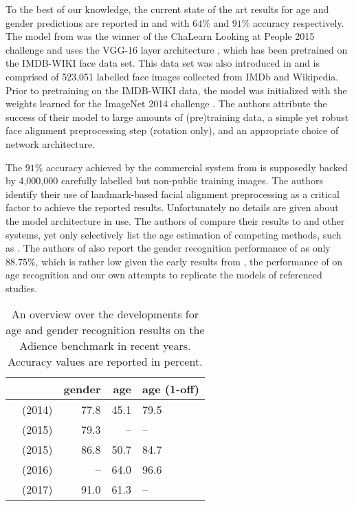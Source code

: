 \documentclass[10pt,twocolumn,letterpaper]{article}
\begin{document}
To the best of our knowledge, the current state of the art results for age and gender predictions are reported in \cite{rothe2016deep} and \cite{dehghan2017dager} with $64\%$ and $91\%$ accuracy respectively. The model from \cite{rothe2016deep} was the winner of the ChaLearn Looking at People 2015 challenge \cite{escalera2015chalearn} and uses the VGG-16 layer architecture \cite{simonyan2014very}, which has been pretrained on the IMDB-WIKI face data set. This data set was also introduced in \cite{rothe2016deep} and is comprised of 523,051 labelled face images collected from IMDb and Wikipedia. Prior to pretraining on the IMDB-WIKI data, the model was initialized with the weights learned for the ImageNet 2014 challenge \cite{russakovsky2015imagenet}. The authors attribute the success of their model to large amounts of (pre)training data, a simple yet robust face alignment preprocessing step (rotation only), and an appropriate choice of network architecture.

The $91\%$ accuracy achieved by the commercial system from \cite{dehghan2017dager} is supposedly backed by 4,000,000 carefully labelled but non-public training images.
The authors identify their use of landmark-based facial alignment preprocessing as a critical factor to achieve the reported results.
Unfortunately no details are given about the model architecture in use. The authors of \cite{dehghan2017dager} compare their results to \cite{rothe2016deep} and other systems, yet only selectively list the age estimation of competing methods, such as \cite{rothe2016deep}.
The authors of \cite{dehghan2017dager} also report the gender recognition performance of \cite{rothe2016deep} as only $88.75\%$, which is rather low given the early results from \cite{levi2015age}, the performance of \cite{rothe2016deep} on age recognition and our own attempts to replicate the models of referenced studies.



\begin{table}
\begin{center}
\begin{tabular}{ll|r|rl}
&& gender & age & age (1-off) \\
\hline
\cite{eidinger2014age}		&(2014) 	& 77.8 	& 45.1 	& 79.5 \\
\cite{hassner2015effective}	&(2015)		& 79.3 	& -- 	& -- \\
\cite{levi2015age}			&(2015) 	& 86.8 	& 50.7 	& 84.7 \\
\cite{rothe2016deep}		&(2016) 	& -- 	& 64.0 	& 96.6 \\
\cite{dehghan2017dager} 	& (2017) 	& 91.0 	& 61.3 	& -- \\
\hline
\end{tabular}
\end{center}
	\caption{An overview over the developments for age and gender recognition results on the Adience benchmark in recent years. Accuracy values are reported in percent.
}
	\label{tab:overview}
\end{table}
\end{document}
